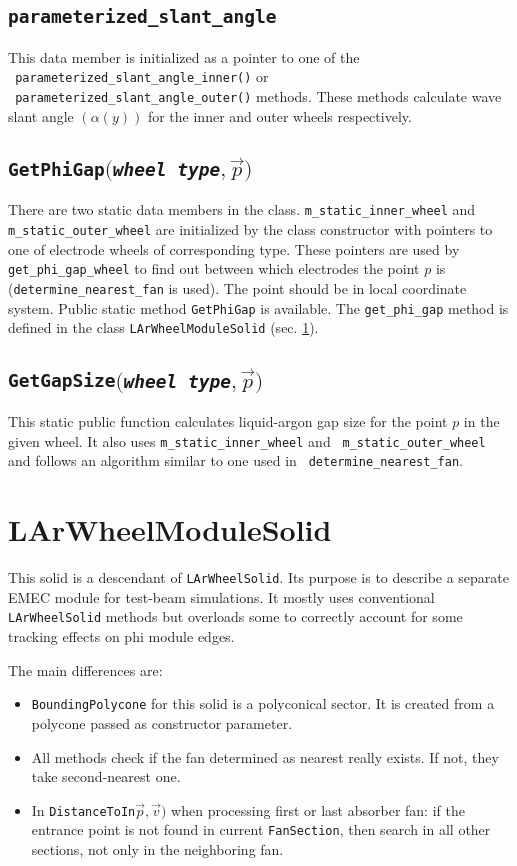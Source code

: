 \documentclass{article}
\begin{document}
\subsection{\tt parameterized\_slant\_angle}\label{par_sla_ang}
This data member is initialized as a pointer to one of the\\ {\tt
parameterized\_slant\_angle\_inner()} or\\ {\tt
parameterized\_slant\_angle\_outer()}
methods. These methods calculate wave slant angle $(\alpha(y))$ for
the inner and
outer wheels respectively.

\subsection{\tt GetPhiGap$(${\em wheel type}$, \vec{p})$}\label{static_wheel}
There are two static data members in the class. {\tt m\_static\_inner\_wheel}
and {\tt m\_static\_outer\_wheel} are initialized by the class constructor with
pointers to one of electrode wheels of corresponding type. These pointers are
used by {\tt get\_phi\_gap\_wheel} to find out between which electrodes the
point $p$ is ({\tt determine\_nearest\_fan} is used). The point should be in
local coordinate system. Public static method {\tt GetPhiGap} is
available. The
{\tt get\_phi\_gap} method is defined in the class {\tt LArWheelModuleSolid} (sec. \ref{lwms}).

\subsection{\tt GetGapSize$(${\em wheel type}$, \vec{p})$}
This static public function calculates liquid-argon gap size for the point $p$
in the given wheel. It also uses {\tt m\_static\_inner\_wheel} and {\tt
m\_static\_outer\_wheel} and follows an algorithm similar to one used in {\tt
determine\_nearest\_fan}.

\section{LArWheelModuleSolid}\label{lwms}
This solid is a descendant of {\tt LArWheelSolid}. Its purpose is to
describe a
separate EMEC module for test-beam simulations. It mostly uses conventional {\tt
LArWheelSolid} methods but overloads some to correctly account for some tracking
effects on phi module edges.

The main differences are:
\begin{itemize}
\item {\tt BoundingPolycone} for this solid is a polyconical sector. It is
created from a polycone passed as constructor parameter.
\item All methods check if the fan determined as nearest really exists. If not,
they take second-nearest one.
\item In {\tt DistanceToIn$\vec{p}, \vec{v})$} when processing first or last
absorber fan: if the entrance point is not found in
current {\tt FanSection}, then search in all other sections, not only in 
the neighboring fan.
\end{itemize}
\end{document}

